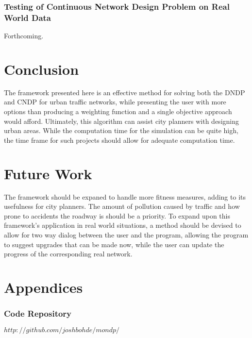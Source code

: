 \documentclass[11pt, oneside, notitlepage, final]{article}
\begin{document}
    \section{Testing of Continuous Network Design Problem on Real World Data}
        Forthcoming.

\part{Conclusion}
    The framework presented here is an effective method for solving both the DNDP and CNDP for urban traffic networks, while presenting the user with more options than producing a weighting function and a single objective approach would afford. Ultimately, this algorithm can assist city planners with designing urban areas. While the computation time for the simulation can be quite high, the time frame for such projects should allow for adequate computation time.

\part{Future Work}
    The framework should be expaned to handle more fitness measures, adding to its usefulness for city planners. The amount of pollution caused by traffic and how prone to accidents the roadway is should be a priority.
    To expand upon this framework's application in real world situations, a method should be devised to allow for two way dialog between the user and the program, allowing the program to suggest upgrades that can be made now, while the user can update the progress of the corresponding real network. 

\clearpage


\clearpage
\appendix
\part*{Appendices}
\section{Code Repository}
$http://github.com/joshbohde/mondp/$
\end{document}
